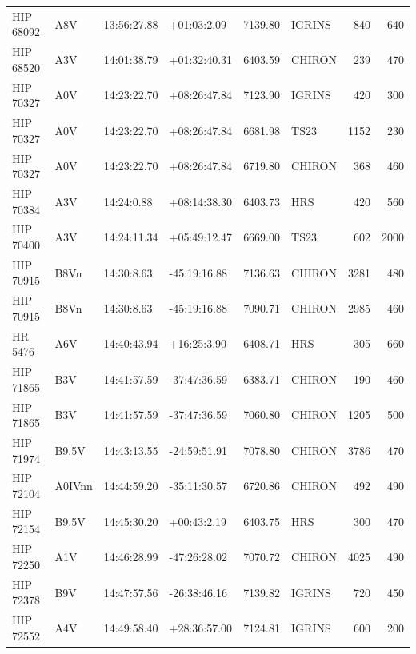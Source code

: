 \documentclass{emulateapj}
\begin{document}
\begin{longtable*}{|l|lllrlrr|}
   HIP 68092 &            A8V &    13:56:27.88 &    +01:03:2.09 &  7139.80 &     IGRINS &      840 &     640 \\
   HIP 68520 &            A3V &    14:01:38.79 &   +01:32:40.31 &  6403.59 &     CHIRON &      239 &     470 \\
   HIP 70327 &            A0V &    14:23:22.70 &   +08:26:47.84 &  7123.90 &     IGRINS &      420 &     300 \\
   HIP 70327 &            A0V &    14:23:22.70 &   +08:26:47.84 &  6681.98 &       TS23 &     1152 &     230 \\
   HIP 70327 &            A0V &    14:23:22.70 &   +08:26:47.84 &  6719.80 &     CHIRON &      368 &     460 \\
   HIP 70384 &            A3V &     14:24:0.88 &   +08:14:38.30 &  6403.73 &        HRS &      420 &     560 \\
   HIP 70400 &            A3V &    14:24:11.34 &   +05:49:12.47 &  6669.00 &       TS23 &      602 &    2000 \\
   HIP 70915 &           B8Vn &     14:30:8.63 &   -45:19:16.88 &  7136.63 &     CHIRON &     3281 &     480 \\
   HIP 70915 &           B8Vn &     14:30:8.63 &   -45:19:16.88 &  7090.71 &     CHIRON &     2985 &     460 \\
     HR 5476 &            A6V &    14:40:43.94 &    +16:25:3.90 &  6408.71 &        HRS &      305 &     660 \\
   HIP 71865 &            B3V &    14:41:57.59 &   -37:47:36.59 &  6383.71 &     CHIRON &      190 &     460 \\
   HIP 71865 &            B3V &    14:41:57.59 &   -37:47:36.59 &  7060.80 &     CHIRON &     1205 &     500 \\
   HIP 71974 &          B9.5V &    14:43:13.55 &   -24:59:51.91 &  7078.80 &     CHIRON &     3786 &     470 \\
   HIP 72104 &         A0IVnn &    14:44:59.20 &   -35:11:30.57 &  6720.86 &     CHIRON &      492 &     490 \\
   HIP 72154 &          B9.5V &    14:45:30.20 &    +00:43:2.19 &  6403.75 &        HRS &      300 &     470 \\
   HIP 72250 &            A1V &    14:46:28.99 &   -47:26:28.02 &  7070.72 &     CHIRON &     4025 &     490 \\
   HIP 72378 &            B9V &    14:47:57.56 &   -26:38:46.16 &  7139.82 &     IGRINS &      720 &     450 \\
   HIP 72552 &            A4V &    14:49:58.40 &   +28:36:57.00 &  7124.81 &     IGRINS &      600 &     200 \\

\end{longtable*}
\end{document}
